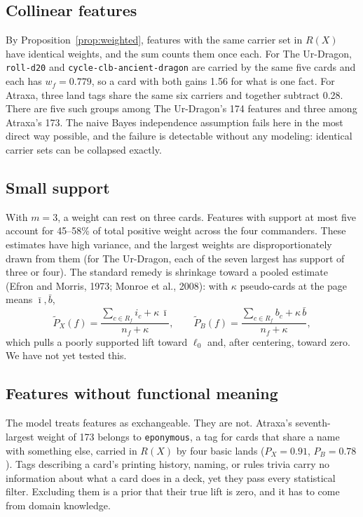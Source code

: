 \documentclass[11pt]{article}
\theoremstyle{remark}
\newcommand{\otag}[1]{\texttt{#1}}
\begin{document}
\subsection{Collinear features}\label{sec:collinear}
\noindent By Proposition~\ref{prop:weighted}, features with the same carrier set
in $R(X)$ have identical weights, and the sum counts them once each. For The
Ur-Dragon, \otag{roll-d20} and \otag{cycle-clb-ancient-dragon} are carried by
the same five cards and each has $w_f=0.779$, so a card with both gains 1.56 for
what is one fact. For Atraxa, three land tags share the same six carriers and
together subtract 0.28. There are five such groups among The Ur-Dragon's 174
features and three among Atraxa's 173. The naive Bayes independence assumption
fails here in the most direct way possible, and the failure is detectable
without any modeling: identical carrier sets can be collapsed exactly.

\subsection{Small support}
\noindent With $m=3$, a weight can rest on three cards. Features with support at
most five account for 45--58\% of total positive weight across the four
commanders. These estimates have high variance, and the largest weights are
disproportionately drawn from them (for The Ur-Dragon, each of the seven largest
has support of three or four).
The standard remedy is shrinkage toward a pooled estimate (Efron and Morris,
1973; Monroe et al., 2008): with $\kappa$ pseudo-cards at the page means
$\bar{\imath},\bar{b}$,
\begin{equation}
  \tilde{P}_X(f)=\frac{\sum_{c\in R_f} i_c+\kappa\,\bar{\imath}}{n_f+\kappa},\qquad
  \tilde{P}_B(f)=\frac{\sum_{c\in R_f} b_c+\kappa\,\bar{b}}{n_f+\kappa},
\end{equation}
which pulls a poorly supported lift toward $\ell_0$ and, after centering, toward
zero. We have not yet tested this.

\subsection{Features without functional meaning}
\noindent The model treats features as exchangeable. They are not. Atraxa's
seventh-largest weight of 173 belongs to \otag{eponymous}, a tag for cards that share a
name with something else, carried in $R(X)$ by four basic lands ($P_X=0.91$,
$P_B=0.78$). Tags describing a card's printing history, naming, or rules trivia
carry no information about what a card does in a deck, yet they pass every
statistical filter. Excluding them is a prior that their true lift is zero, and
it has to come from domain knowledge.
\end{document}
